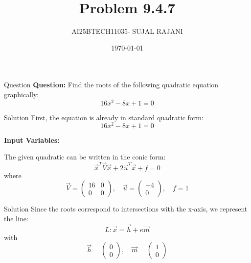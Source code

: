 \documentclass{beamer}
\title{Problem 9.4.7}
\author{AI25BTECH11035- SUJAL RAJANI}
\date{\today}
\begin{document}
\begin{frame}
  \titlepage
\end{frame}

\begin{frame}{Question}
  \textbf{Question:} Find the roots of the following quadratic equation graphically:
  \[
    16x^2 - 8x + 1 = 0
  \]
\end{frame}

\begin{frame}{Solution}
First, the equation is already in standard quadratic form:
\[
  16x^2 - 8x + 1 = 0
\]

\textbf{Input Variables:}

The given quadratic can be written in the conic form:
\[
  \vec{x}^T\vec{V}\vec{x} + 2\vec{u}^T\vec{x} + f = 0
\]
where
\[
  \vec{V} = \begin{pmatrix} 16 & 0 \\ 0 & 0 \end{pmatrix}, \quad
  \vec{u} = \begin{pmatrix} -4 \\ 0 \end{pmatrix}, \quad
  f = 1
\]
\end{frame}

\begin{frame}{Solution}
Since the roots correspond to intersections with the x-axis, we represent the line:
\[
  L : \vec{x} = \vec{h} + \kappa\vec{m}
\]
with
\[
  \vec{h} = \begin{pmatrix} 0 \\ 0 \end{pmatrix}, \quad
  \vec{m} = \begin{pmatrix} 1 \\ 0 \end{pmatrix}
\]
\end{frame}
\end{document}
